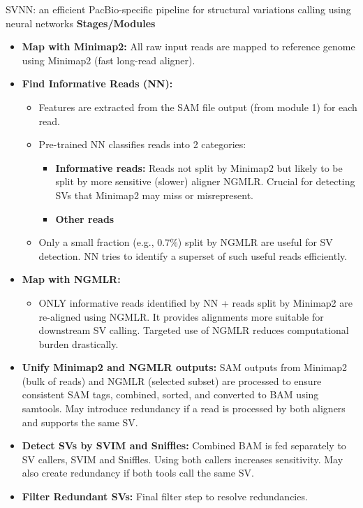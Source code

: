 \documentclass[twocolumn]{article}
\begin{document}
\begin{literaturepaper}{SVNN: an efficient PacBio-specific pipeline for structural variations calling using neural networks \cite{Akbarinejad2021}}
    \textbf{Stages/Modules}
    \begin{itemize}
        \item \textbf{Map with Minimap2:} All raw input reads are mapped to reference genome using Minimap2 (fast long-read aligner).
        \item \textbf{Find Informative Reads (NN):}
        \begin{itemize}
            \item Features are extracted from the SAM file output (from module 1) for each read.
            \item Pre-trained NN classifies reads into 2 categories:
            \begin{itemize}
                \item \textbf{Informative reads:} Reads not split by Minimap2 but likely to be split by more sensitive (slower) aligner NGMLR. Crucial for detecting SVs that Minimap2 may miss or misrepresent.
                \item \textbf{Other reads}
            \end{itemize}
            \item Only a small fraction (e.g., $0.7\%$) split by NGMLR are useful for SV detection. NN tries to identify a superset of such useful reads efficiently.   
        \end{itemize} 
        \item \textbf{Map with NGMLR:}
        \begin{itemize}
            \item ONLY informative reads identified by NN + reads split by Minimap2 are re-aligned using NGMLR. It provides alignments more suitable for downstream SV calling. Targeted use of NGMLR reduces computational burden drastically.
        \end{itemize}
        \item \textbf{Unify Minimap2 and NGMLR outputs:} SAM outputs from Minimap2 (bulk of reads) and NGMLR (selected subset) are processed to ensure consistent SAM tags, combined, sorted, and converted to BAM using samtools. May introduce redundancy if a read is processed by both aligners and supports the same SV.
        \item \textbf{Detect SVs by SVIM and Sniffles:} Combined BAM is fed separately to SV callers, SVIM and Sniffles. Using both callers increases sensitivity. May also create redundancy if both tools call the same SV.
        \item \textbf{Filter Redundant SVs:} Final filter step to resolve redundancies.

\end{itemize}
\end{literaturepaper}
\end{document}
